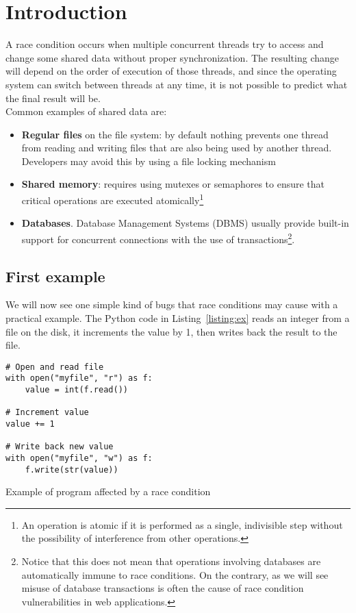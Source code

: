 \section{Introduction}

A race condition occurs when multiple concurrent threads try to access and change some shared data without proper synchronization. The resulting change will depend on the order of execution of those threads, and since the operating system can switch between threads at any time, it is not possible to predict what the final result will be.\\

Common examples of shared data are:
\begin{itemize}
  \item \textbf{Regular files} on the file system: by default nothing prevents one thread from reading and writing files that are also being used by another thread. Developers may avoid this by using a file locking mechanism
  \item \textbf{Shared memory}: requires using mutexes or semaphores to ensure that critical operations are executed atomically\footnote{An operation is atomic if it is performed as a single, indivisible step without the possibility of interference from other operations.}
  \item \textbf{Databases}. Database Management Systems (DBMS) usually provide built-in support for concurrent connections with the use of transactions\footnote{Notice that this does not mean that operations involving databases are automatically immune to race conditions. On the contrary, as we will see misuse of database transactions is often the cause of race condition vulnerabilities in web applications.}.
\end{itemize}

\subsection{First example}

We will now see one simple kind of bugs that race conditions may cause with a practical example. The Python code in Listing~\ref{listing:ex} reads an integer from a file on the disk, it increments the value by 1, then writes back the result to the file.

\begin{listing}[H]
\begin{verbatim}
# Open and read file
with open("myfile", "r") as f:
    value = int(f.read())

# Increment value
value += 1

# Write back new value
with open("myfile", "w") as f:
    f.write(str(value))
\end{verbatim}
\caption{Example of program affected by a race condition}
\label{listing:ex}
\end{listing}

